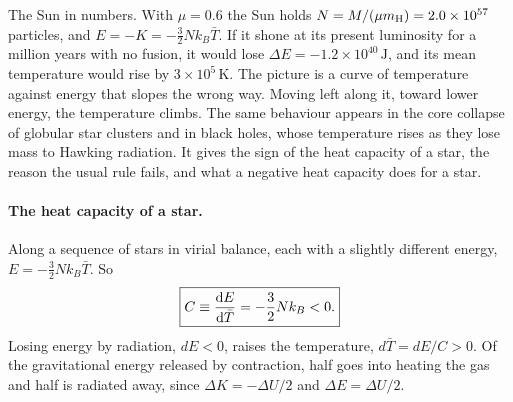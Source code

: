 The Sun in numbers. With $\mu=0.6$ the Sun holds $N=M/(\mu m_{\rm H})=2.0\times10^{57}$ particles, and $E=-K=-\tfrac32Nk_B\bar T$. If it shone at its present luminosity for a million years with no fusion, it would lose $\Delta E=-1.2\times10^{40}\,\mathrm J$, and its mean temperature would rise by $3\times10^5\,\mathrm K$. The picture is a curve of temperature against energy that slopes the wrong way. Moving left along it, toward lower energy, the temperature climbs. The same behaviour appears in the core collapse of globular star clusters and in black holes, whose temperature rises as they lose mass to Hawking radiation. It gives the sign of the heat capacity of a star, the reason the usual rule fails, and what a negative heat capacity does for a star.

\paragraph{The heat capacity of a star.} Along a sequence of stars in virial balance, each with a slightly different energy, $E=-\tfrac32Nk_B\bar T$. So
\begin{equation}
	\boxed{C\equiv\dv{E}{\bar T}=-\frac32Nk_B<0.}
	\label{sg:eq:negative_C}
\end{equation}
Losing energy by radiation, $dE<0$, raises the temperature, $d\bar T=dE/C>0$. Of the gravitational energy released by contraction, half goes into heating the gas and half is radiated away, since $\Delta K=-\Delta U/2$ and $\Delta E=\Delta U/2$.

